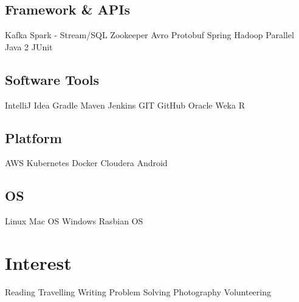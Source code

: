 \documentclass[]{main}
\begin{document}
\begin{minipage}[t]{0.25\textwidth}
\subsection{Framework \& APIs}\sectionsep
                    Kafka
    \textbullet{}   Spark - Stream/SQL  
    \textbullet{}   Zookeeper
    \textbullet{}   Avro    
    \textbullet{}   Protobuf 
    \textbullet{}   Spring 
    \textbullet{}   Hadoop  
    \textbullet{}   Parallel Java 2  
    \textbullet{}   JUnit
\sectionsep\sectionsep
\subsection{Software Tools}\sectionsep
                    IntelliJ Idea  
    \textbullet{}   Gradle 
    \textbullet{}   Maven  
    \textbullet{}   Jenkins  
    \textbullet{}   GIT 
    \textbullet{}   GitHub  
    \textbullet{}   Oracle  
    \textbullet{}   Weka 
    \textbullet{}   R
\sectionsep\sectionsep
\subsection{Platform}\sectionsep
                    AWS 
    \textbullet{}   Kubernetes
    \textbullet{}   Docker
    \textbullet{}   Cloudera
    \textbullet{}   Android
\sectionsep\sectionsep
\subsection{OS}\sectionsep
                    Linux 
    \textbullet{}   Mac OS 
    \textbullet{}   Windows  
    \textbullet{}   Rasbian OS
\sectionsep\sectionsep


\section{Interest}
                    Reading 
    \textbullet{}   Travelling
    \textbullet{}   Writing 
    \textbullet{}   Problem Solving
    \textbullet{}   Photography
    \textbullet{}   Volunteering
\sectionsep


%
%

\end{minipage} 
\hfill
\end{document}
